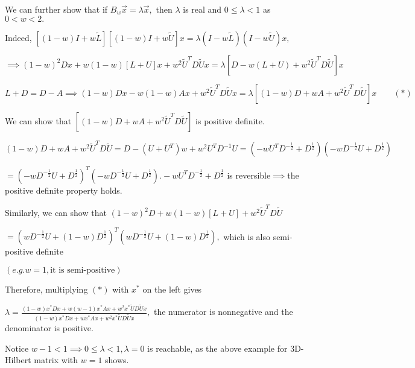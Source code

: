 \documentclass{article}
\begin{document}
We can further show that if $B_{w}\vec{x}=\lambda \vec{x},$ then $\lambda $
is real and $0\leq \lambda <1$ as $0<w<2.$

Indeed, $\left[ \left( 1-w\right) I+w\tilde{L}\right] \left[ \left(
1-w\right) I+w\tilde{U}\right] x=\lambda \left( I-w\tilde{L}\right) \left(
I-w\tilde{U}\right) x,$

$\implies \left( 1-w\right) ^{2}Dx+w\left( 1-w\right) \left[ L+U\right]
x+w^{2}\tilde{U}^{T}D\tilde{U}x=\lambda \left[ D-w\left( L+U\right) +w^{2}%
\tilde{U}^{T}D\tilde{U}\right] x$

$L+D=D-A\implies \left( 1-w\right) Dx-w\left( 1-w\right) Ax+w^{2}\tilde{U}%
^{T}D\tilde{U}x=\lambda \left[ \left( 1-w\right) D+wA+w^{2}\tilde{U}^{T}D%
\tilde{U}\right] x\qquad \left( \ast \right) $

We can show that $\left[ \left( 1-w\right) D+wA+w^{2}\tilde{U}^{T}D\tilde{U}%
\right] $ is positive definite. 

\bigskip $\left( 1-w\right) D+wA+w^{2}\tilde{U}^{T}D\tilde{U}=D-\left(
U+U^{T}\right) w+w^{2}U^{T}D^{-1}U=\left( -wU^{T}D^{-\frac{1}{2}}+D^{\frac{1%
}{2}}\right) \left( -wD^{-\frac{1}{2}}U+D^{\frac{1}{2}}\right) $

$=\left( -wD^{-\frac{1}{2}}U+D^{\frac{1}{2}}\right) ^{T}\left( -wD^{-\frac{1%
}{2}}U+D^{\frac{1}{2}}\right) .-wU^{T}D^{-\frac{1}{2}}+D^{\frac{1}{2}}$ is
reversible$\implies $the positive definite property holds.

Similarly, we can show that $\left( 1-w\right) ^{2}D+w\left( 1-w\right) %
\left[ L+U\right] +w^{2}\tilde{U}^{T}D\tilde{U}$

$=\left( wD^{-\frac{1}{2}}U+\left( 1-w\right) D^{\frac{1}{2}}\right)
^{T}\left( wD^{-\frac{1}{2}}U+\left( 1-w\right) D^{\frac{1}{2}}\right) ,$%
which is also semi-positive definite

$\left( e.g.w=1,\text{it is semi-positive}\right) $

Therefore, multiplying $\left( \ast \right) $ with $x^{\ast }$ on the left
gives

$\lambda =\frac{\left( 1-w\right) x^{\ast }Dx+w\left( w-1\right) x^{\ast
}Ax+w^{2}x^{\ast }\tilde{U}D\tilde{U}x}{\left( 1-w\right) x^{\ast
}Dx+wx^{\ast }Ax+w^{2}x^{\ast }\tilde{U}D\tilde{U}x},$ the numerator is
nonnegative and the denominator is positive.

Notice $w-1<1\implies 0\leq \lambda <1,\lambda =0$ is reachable, as the
above example for 3D-Hilbert matrix with $w=1$ shows.

\bigskip 
\end{document}
